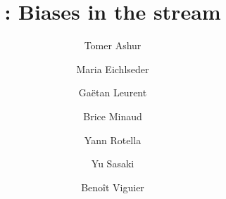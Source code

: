 \documentclass[a4paper]{llncs}
\author{}
\institute{}
\author{Tomer Ashur \and Maria Eichlseder \and Ga\"etan Leurent \and Brice Minaud \and Yann Rotella \and Yu Sasaki \and Beno\^it Viguier}
\institute{}
\begin{document}
\title{\morus: Biases in the stream}
\maketitle










\ifanonymous
\else
\fi




\appendix


\end{document}
